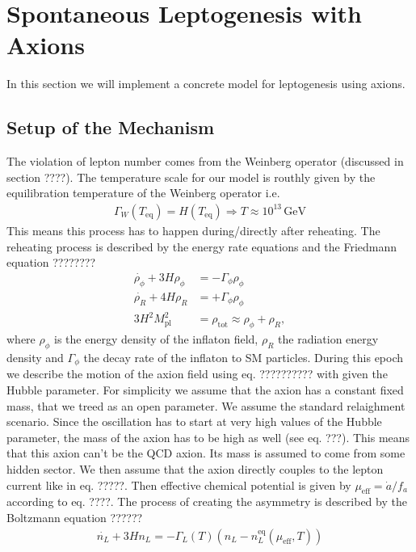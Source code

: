 \documentclass[13pt,a4paper,twoside,titlepage]{article}
\begin{document}
\section{Spontaneous Leptogenesis with Axions}
\label{sec:spont_bg_lepto_with_axions}

In this section we will implement a concrete model for leptogenesis using axions.

\subsection{Setup of the Mechanism}
The violation of lepton number comes from the Weinberg operator (discussed in section ????).
The temperature scale for our model is routhly given by the equilibration temperature of the Weinberg operator i.e.
\begin{align}
    \Gamma_W(T_\mathrm{eq}) = H(T_\mathrm{eq}) \Rightarrow T \approx 10^{13} \, \mathrm{GeV}
\end{align}
This means this process has to happen during/directly after reheating. The reheating process is described by the energy rate equations and the Friedmann equation ????????
\begin{align}
    \dot{\rho_\phi} + 3 H \rho_\phi &= - \Gamma_\phi \rho_\phi \\
    \dot{\rho_R} + 4 H \rho_R &= + \Gamma_\phi \rho_\phi \\
    3 H^2 M_\mathrm{pl}^2 &= \rho_\mathrm{tot} \approx \rho_\phi + \rho_R,
\end{align}
where $\rho_\phi$ is the energy density of the inflaton field, $\rho_R$ the radiation energy density and $\Gamma_\phi$ the decay rate of the inflaton to SM particles.
During this epoch we describe the motion of the axion field using eq. ?????????? with given the Hubble parameter.
For simplicity we assume that the axion has a constant fixed mass, that we treed as an open parameter. We assume the standard relaighment scenario. Since the oscillation has to start at very high values of the Hubble parameter, the mass of the axion has to be high as well (see eq. ???).
This means that this axion can't be the QCD axion. Its mass is assumed to come from some hidden sector.
We then assume that the axion directly couples to the lepton current like in eq. ?????. Then effective chemical potential is given by $\mu_\mathrm{eff} = \dot{a}/f_a$ according to eq. ????.
The process of creating the asymmetry is described by the Boltzmann equation ??????
\begin{align}
    \dot{n_L} + 3 H n_L = - \Gamma_L(T) (n_L - n_L^\mathrm{eq}(\mu_\mathrm{eff}, T))
\end{align}
\end{document}
